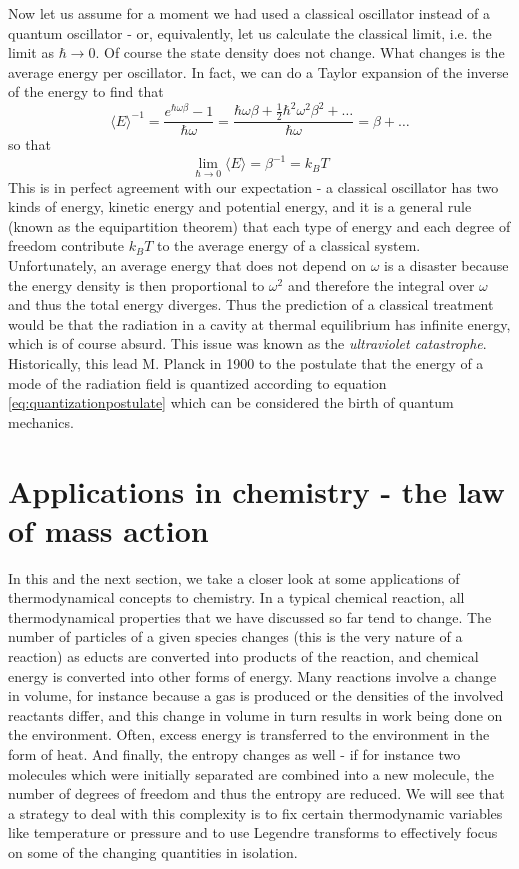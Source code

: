 \documentclass[a4paper, draft]{report}
\numberwithin{section}{chapter}
\numberwithin{equation}{chapter}
\theoremstyle{own}
\theoremstyle{remark}
\begin{document}
Now let us assume for a moment we had used a classical oscillator instead of a quantum oscillator - or, equivalently, let us calculate the classical limit, i.e. the limit as 
$\hbar \rightarrow 0$. Of course the state density does not change. What changes is the average energy per oscillator. In fact, we can do a Taylor expansion of the inverse of the energy to find that
$$
{\langle E \rangle}^{-1} = \frac{e^{\hbar \omega \beta} - 1}{\hbar \omega}
= \frac{\hbar \omega \beta + \frac{1}{2} \hbar^2 \omega^2 \beta^2 + \dots }{\hbar \omega}
= \beta + \dots
$$
so that
$$
\lim_{\hbar \rightarrow 0} \langle E \rangle = \beta^{-1} = k_B T
$$
This is in perfect agreement with our expectation - a classical oscillator has two kinds of energy, kinetic energy and potential energy, and it is a general rule (known as the equipartition theorem) that each type of energy and each degree of freedom contribute $k_B T$ to the average energy of a classical system. Unfortunately, an average energy that does not depend on $\omega$ is a disaster because the energy density is then proportional to $\omega^2$ and therefore the integral over $\omega$ and thus the total energy diverges. Thus the prediction of a classical treatment would be that the radiation in a cavity at thermal equilibrium has infinite energy, which is of course absurd. This issue was known as the {\em ultraviolet catastrophe}. Historically, this lead M. Planck in 1900 to the postulate that the energy of a mode of the radiation field is quantized according to equation \eqref{eq:quantizationpostulate} which can be considered the birth of quantum mechanics. 

\section{Applications in chemistry - the law of mass action}

In this and the next section, we take a closer look at some applications of thermodynamical concepts to chemistry. In a typical chemical reaction, all thermodynamical properties that we have discussed so far tend to change. The number of particles of a given species changes (this is the very nature of a reaction) as educts are converted into products of the reaction, and chemical energy is converted into other forms of energy. Many reactions involve a change in volume, for instance because a gas is produced or the densities of the involved reactants differ, and this change in volume in turn results in work being done on the environment. Often, excess energy is transferred to the environment in the form of heat. And finally, the entropy changes as well - if for instance two molecules which were initially separated are combined into a new molecule, the number of degrees of freedom and thus the entropy are reduced. We will see that a strategy to deal with this complexity is to fix certain thermodynamic variables like temperature or pressure and to use Legendre transforms to effectively focus on some of the changing quantities in isolation.
\end{document}
